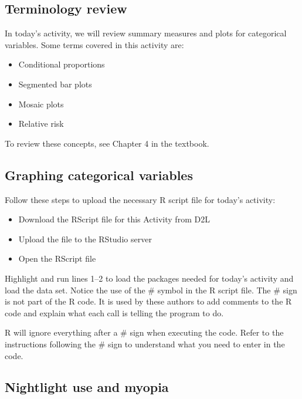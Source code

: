 \documentclass[
]{report}
\begin{document}
\subsection{Terminology review}\label{terminology-review-1}

In today's activity, we will review summary measures and plots for categorical variables. Some terms covered in this activity are:

\begin{itemize}
\item
  Conditional proportions
\item
  Segmented bar plots
\item
  Mosaic plots
\item
  Relative risk
\end{itemize}

To review these concepts, see Chapter 4 in the textbook.

\subsection{Graphing categorical variables}\label{graphing-categorical-variables}

Follow these steps to upload the necessary R script file for today's activity:

\begin{itemize}
\item
  Download the RScript file for this Activity from D2L
\item
  Upload the file to the RStudio server
\item
  Open the RScript file
\end{itemize}

Highlight and run lines 1--2 to load the packages needed for today's activity and load the data set. Notice the use of the \# symbol in the R script file. The \# sign is not part of the R code. It is used by these authors to add comments to the R code and explain what each call is telling the program to do.

R will ignore everything after a \# sign when executing the code. Refer to the instructions following the \# sign to understand what you need to enter in the code.

\subsection*{Nightlight use and myopia}\label{nightlight-use-and-myopia}
\end{document}
